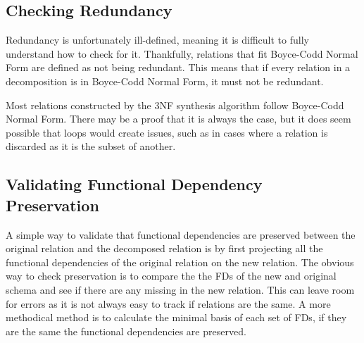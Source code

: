 \documentclass{report}
\begin{document}
\subsection{Checking Redundancy}

Redundancy is unfortunately ill-defined, meaning it is difficult to fully understand how to check for it. Thankfully, relations that fit Boyce-Codd Normal Form are defined as not being redundant. This means that if every relation in a decomposition is in  Boyce-Codd Normal Form, it must not be redundant.

\begin{note}
    Most relations constructed by the 3NF synthesis algorithm follow Boyce-Codd Normal Form. There may be a proof that it is always the case, but it does seem possible that loops would create issues, such as in cases where a relation is discarded as it is the subset of another. 
\end{note}

\subsection{Validating Functional Dependency Preservation}

A simple way to validate that functional dependencies are preserved between the original relation and the decomposed relation is by first projecting all the functional dependencies of the original relation on the new relation. The obvious way to check preservation is to compare the the FDs of the new and original schema and see if there are any missing in the new relation. This can leave room for errors as it is not always easy to track if relations are the same. A more methodical method is to calculate the minimal basis of each set of FDs, if they are the same the functional dependencies are preserved.
\end{document}
